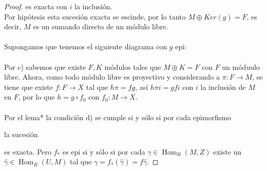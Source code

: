 \documentclass{article}
\begin{document}
\begin{enumerate}[label=\textbf{Ej \arabic*.}]
\begin{proof}
			es exacta con $i$ la inclusión.\\
			Por hipótesis esta sucesión exacta se escinde, por lo tanto $M\oplus Ker(g)=F$, es decir, $M$ es un sumando directo de un módulo libre.\\
			\\
			Supongamos que tenemos el siguiente diagrama con $g$ epi:\\
			\\
			Por c) sabemos que existe $F,K$ módulos tales que $M\oplus K=F$ con $F$ un móduulo libre. Ahora,  como todo módulo libre es proyectivo y 
			considerando a $\pi\colon F\longrightarrow M$, se tiene que existe $f\colon F\longrightarrow X$ tal que $h\pi=fg$, así
			$h\pi i=gfi$ con $i$ la inclusión de $M$ en $F$, por lo que $h=g\circ f_0$ con $f_0\colon M\longrightarrow X$.\\
			\\
			Por el lema* la condición d) se cumple si y sólo si por cada epimorfismo 
			la sucesión 
			es exacta. Pero $f_*$ es epi si y sólo si por cada $\gamma\in \operatorname{Hom}_R(M,Z)$ existe un $\hat{\gamma}\in \operatorname{Hom}_R(U,M)$
			tal que $\gamma=f_*(\hat{\gamma})=f\hat{\gamma}.$
			

\end{proof}
\end{enumerate}
\end{document}
